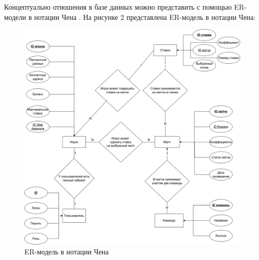 Концептуально отношения в базе данных можно представить с помощью ER-модели в нотации Чена \cite{dbms}.
\newpage
На рисунке 2 представлена ER-модель в нотации Чена:
\FloatBarrier
\begin{figure}[hp]	
	\begin{center}
		\includegraphics[width=\linewidth]{inc/chen.png}
	\end{center}
	\caption{ER-модель в нотации Чена}
	\label{fig::chen}
\end{figure}
\FloatBarrier
